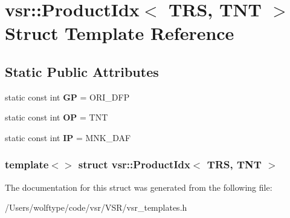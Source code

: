 \hypertarget{structvsr_1_1_product_idx_3_01_t_r_s_00_01_t_n_t_01_4}{\section{vsr\-:\-:Product\-Idx$<$ T\-R\-S, T\-N\-T $>$ Struct Template Reference}
\label{structvsr_1_1_product_idx_3_01_t_r_s_00_01_t_n_t_01_4}
}
\subsection*{Static Public Attributes}
\begin{DoxyCompactItemize}
\item 
\hypertarget{structvsr_1_1_product_idx_3_01_t_r_s_00_01_t_n_t_01_4_a11527ef2ddf0fa209910e011012d735d}{static const int {\bfseries G\-P} = O\-R\-I\-\_\-\-D\-F\-P}\label{structvsr_1_1_product_idx_3_01_t_r_s_00_01_t_n_t_01_4_a11527ef2ddf0fa209910e011012d735d}

\item 
\hypertarget{structvsr_1_1_product_idx_3_01_t_r_s_00_01_t_n_t_01_4_abf850d83acb362ac19ed8946d816b4d3}{static const int {\bfseries O\-P} = T\-N\-T}\label{structvsr_1_1_product_idx_3_01_t_r_s_00_01_t_n_t_01_4_abf850d83acb362ac19ed8946d816b4d3}

\item 
\hypertarget{structvsr_1_1_product_idx_3_01_t_r_s_00_01_t_n_t_01_4_acb8b753af5823804b542bca8e9977f73}{static const int {\bfseries I\-P} = M\-N\-K\-\_\-\-D\-A\-F}\label{structvsr_1_1_product_idx_3_01_t_r_s_00_01_t_n_t_01_4_acb8b753af5823804b542bca8e9977f73}

\end{DoxyCompactItemize}
\subsubsection*{template$<$$>$ struct vsr\-::\-Product\-Idx$<$ T\-R\-S, T\-N\-T $>$}



The documentation for this struct was generated from the following file\-:\begin{DoxyCompactItemize}
\item 
/\-Users/wolftype/code/vsr/\-V\-S\-R/vsr\-\_\-templates.\-h\end{DoxyCompactItemize}
